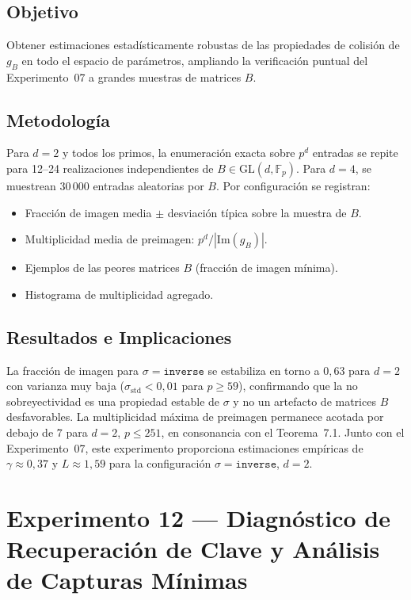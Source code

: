 \documentclass[12pt,a4paper]{article}
\theoremstyle{definition}
\newcommand{\Fp}{\mathbb{F}_p}
\newcommand{\GL}{\mathrm{GL}}
\newcommand{\Img}{\mathrm{Im}}
\begin{document}
\subsection{Objetivo}

Obtener estimaciones estadísticamente robustas de las propiedades de
colisión de $g_B$ en todo el espacio de parámetros, ampliando la
verificación puntual del Experimento~07 a grandes muestras de
matrices $B$.

\subsection{Metodología}

Para $d = 2$ y todos los primos, la enumeración exacta sobre $p^d$
entradas se repite para 12--24 realizaciones independientes de
$B \in \GL(d,\Fp)$. Para $d = 4$, se muestrean 30\,000 entradas
aleatorias por $B$. Por configuración se registran:
\begin{itemize}
  \item Fracción de imagen media $\pm$ desviación típica sobre la
    muestra de $B$.
  \item Multiplicidad media de preimagen: $p^d / |\Img(g_B)|$.
  \item Ejemplos de las peores matrices $B$ (fracción de imagen
    mínima).
  \item Histograma de multiplicidad agregado.
\end{itemize}

\subsection{Resultados e Implicaciones}

La fracción de imagen para $\sigma = \texttt{inverse}$ se estabiliza
en torno a $0{,}63$ para $d = 2$ con varianza muy baja
($\sigma_{\text{std}} < 0{,}01$ para $p \geq 59$), confirmando que
la no sobreyectividad es una propiedad estable de $\sigma$ y no un
artefacto de matrices $B$ desfavorables. La multiplicidad máxima de
preimagen permanece acotada por debajo de 7 para $d = 2$,
$p \leq 251$, en consonancia con el Teorema~7.1. Junto con el
Experimento~07, este experimento proporciona estimaciones empíricas
de $\gamma \approx 0{,}37$ y $L \approx 1{,}59$ para la configuración
$\sigma = \texttt{inverse}$, $d = 2$.

\section{Experimento 12 --- Diagnóstico de Recuperación de Clave y Análisis de Capturas Mínimas}
\end{document}
